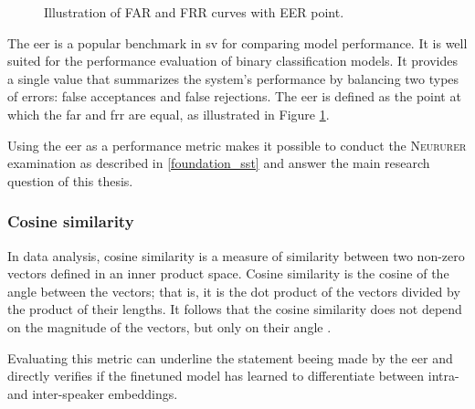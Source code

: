 \begin{figure}[htbp] %
    \centering %
    \caption{Illustration of FAR and FRR curves with EER point.} %
    \label{fig:eer_curve} %
\end{figure}

The \gls{eer} is a popular benchmark in \gls{sv} for comparing model performance. It is well suited for the performance evaluation of binary classification models. It provides a single value that summarizes the system's performance by balancing two types of errors: false acceptances and false rejections. The \gls{eer} is defined as the point at which the \gls{far} and \gls{frr} are equal, as illustrated in Figure \ref{fig:eer_curve}.

\pagebreak [2]
Using the \gls{eer} as a performance metric makes it possible to conduct the \textsc{Neururer} examination \cite{neururer2023deep} as described in \ref{foundation_sst} and answer the main research question of this thesis.

\subsubsection{Cosine similarity}
In data analysis, cosine similarity is a measure of similarity between two non-zero vectors defined in an inner product space. Cosine similarity is the cosine of the angle between the vectors; that is, it is the dot product of the vectors divided by the product of their lengths. It follows that the cosine similarity does not depend on the magnitude of the vectors, but only on their angle \cite{HAN201239, Singhal2001ModernIR}.

Evaluating this metric can underline the statement beeing made by the \gls{eer} and directly verifies if the finetuned model has learned to differentiate between intra- and inter-speaker embeddings.

